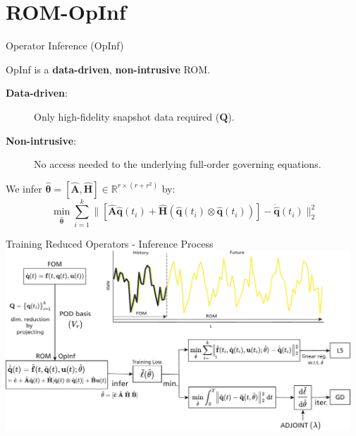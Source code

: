 \section{ROM-OpInf}

\begin{frame}{Operator Inference (OpInf)}
\begin{center}
    OpInf is a \textbf{data-driven}, \textbf{non-intrusive} ROM.
\end{center}

\vspace{0.3cm}

    \begin{description}
    \item[\textbf{Data-driven}:] Only high-fidelity snapshot data required ($\mathbf{Q}$).\vspace{0.1cm}
    \item[\textbf{Non-intrusive}:] No access needed to the underlying full-order governing equations.
    \end{description}

\vspace{0.6cm}

We infer $\hat{\bm{\theta}}=[\hat{\mathbf{A}},\hat{\mathbf{H}}]\in\mathbb{R}^{r\times(r+r^2)}$ by: $$~\displaystyle\min_{\hat{\bm{\theta}}} \sum_{i=1}^k\Bigg\| \left[\hat{\mathbf{A}}\hat{\mathbf{q}}(t_i) + \hat{\mathbf{H}}\left(\hat{\mathbf{q}}(t_i)\otimes\hat{\mathbf{q}}(t_i) \right)\right] - \dot{\hat{\mathbf{q}}}(t_i)\Bigg\|_2^2$$

\end{frame}


\begin{frame}{Training Reduced Operators - Inference Process}
    \vspace{0.2cm}
    \centering
    \includegraphics[width=0.97\textwidth]{images/intro_scheme.pdf} 
\end{frame}